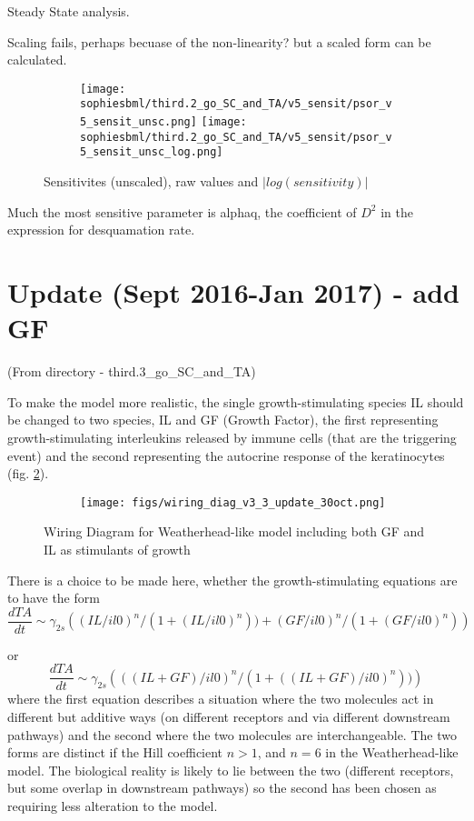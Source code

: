 \documentclass[a4paper,10pt]{report}
\newcommand{\psortbase}{/home/ngrs2/work/bsu/PSORT_Zuliani_Reynolds/}
\newcommand{\sbmlbase}{\psortbase/sbml-sh/}
\newcommand{\sophiesbml}{\sbmlbase/sophie_like}
\begin{document}
Steady State analysis. 

Scaling fails, perhaps becuase of the non-linearity? but a scaled form can be calculated. 

\begin{figure}[h!]
  \begin{subfigure}{\textwidth}
    \texttt{[image: \\sophiesbml/third.2\_go\_SC\_and\_TA/v5\_sensit/psor\_v5\_sensit\_unsc.png]}
    \texttt{[image: \\sophiesbml/third.2\_go\_SC\_and\_TA/v5\_sensit/psor\_v5\_sensit\_unsc\_log.png]}
  \end{subfigure}
  \caption{Sensitivites (unscaled), raw values and $|log(sensitivity)|$}
  \label{fig:thirdpointtwosophie_sensit_unsc}
\end{figure}


Much the most sensitive parameter is alphaq, the coefficient of $D^2$ in the expression for desquamation rate.



\section{Update (Sept 2016-Jan 2017) - add GF} \label{sec:SWsep16}

(From directory  - third.3\_go\_SC\_and\_TA) 

To make the model more realistic, the single growth-stimulating species IL should be changed to two species, IL and GF (Growth Factor), the first representing growth-stimulating interleukins released by immune cells (that are the triggering event) and the second representing the autocrine response of the keratinocytes (fig. \ref{fig:sophie_3_3_wiring}).

\begin{figure}[h!]
    \centering  
  \begin{subfigure}{.65\textwidth}
    \texttt{[image: figs/wiring\_diag\_v3\_3\_update\_30oct.png]}
  \end{subfigure}
  \caption{Wiring Diagram for Weatherhead-like model including both GF and IL as stimulants of growth}
  \label{fig:sophie_3_3_wiring}
\end{figure}


There is a choice to be made here, whether the growth-stimulating equations are to have the form
\[
\frac{dTA}{dt} \sim \gamma_{2s}  \left( (IL/il0)^n / (1+(IL/il0)^n )) + (GF/il0)^n / (1+(GF/il0)^n )\right)
\]

or
\[
\frac{dTA}{dt} \sim \gamma_{2s}  \left( ((IL+GF)/il0)^n / (1+((IL+GF)/il0)^n )) \right)
\]
where the first equation describes a situation where the two molecules act in different but additive ways (on different receptors and via different downstream pathways)
and the second where the two molecules are interchangeable. The two forms are distinct if the Hill coefficient $n > 1$, and $n=6$ in the Weatherhead-like model. The biological reality is likely to lie between the two (different receptors, but some overlap in downstream pathways) so the second has been chosen as requiring less alteration to the model. 
\end{document}
